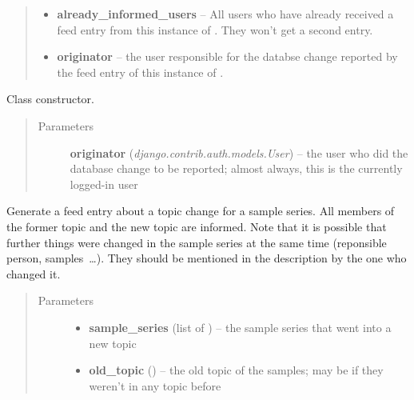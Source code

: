 \documentclass[a4paper,11pt,english]{sphinxmanual}
\begin{document}
\begin{fulllineitems}
\begin{quote}
\begin{description}
\begin{itemize}
\item {} 
\textbf{already\_informed\_users} -- All users who have already received a feed
entry from this instance of .  They won't get a second
entry.

\item {} 
\textbf{originator} -- the user responsible for the databse change reported by
the feed entry of this instance of .

\end{itemize}

\end{description}\end{quote}

Class constructor.
\begin{quote}\begin{description}
\item[{Parameters}] \leavevmode
\textbf{originator} (\emph{django.contrib.auth.models.User}) -- the user who did the database change to be reported;
almost always, this is the currently logged-in user

\end{description}\end{quote}

\begin{fulllineitems}
\label{programming/utilities:samples.utils.views.Reporter.report_changed_sample_series_topic}
Generate a feed entry about a topic change for a sample series.
All members of the former topic and the new topic are informed.
Note that it is possible that further things were changed in the sample
series at the same time (reponsible person, samples …).  They should be
mentioned in the description by the one who changed it.
\begin{quote}\begin{description}
\item[{Parameters}] \leavevmode\begin{itemize}
\item {} 
\textbf{sample\_series} (list of ) -- the sample series that went into a new topic

\item {} 
\textbf{old\_topic} () -- the old topic of the samples; may be  if
they weren't in any topic before


\end{itemize}
\end{description}
\end{quote}
\end{fulllineitems}
\end{fulllineitems}
\end{document}
